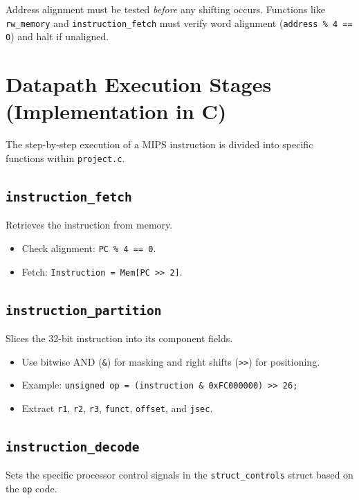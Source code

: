 \begin{remark}
Address alignment must be tested \textit{before} any shifting occurs. Functions like \texttt{rw\_memory} and \texttt{instruction\_fetch} must verify word alignment (\texttt{address \% 4 == 0}) and halt if unaligned.
\end{remark}

\section{Datapath Execution Stages (Implementation in C)}

The step-by-step execution of a MIPS instruction is divided into specific functions within \texttt{project.c}.

\subsection{\texttt{instruction\_fetch}}
Retrieves the instruction from memory.

\begin{itemize}
    \item Check alignment: \texttt{PC \% 4 == 0}.
    \item Fetch: \texttt{Instruction = Mem[PC >> 2]}.
\end{itemize}

\subsection{\texttt{instruction\_partition}}
Slices the 32-bit instruction into its component fields.

\begin{itemize}
    \item Use bitwise AND (\texttt{\&}) for masking and right shifts (\texttt{>>}) for positioning.
    \item Example: \texttt{unsigned op = (instruction \& 0xFC000000) >> 26;}
    \item Extract \texttt{r1}, \texttt{r2}, \texttt{r3}, \texttt{funct}, \texttt{offset}, and \texttt{jsec}.
\end{itemize}

\subsection{\texttt{instruction\_decode}}
Sets the specific processor control signals in the \texttt{struct\_controls} struct based on the \texttt{op} code.

